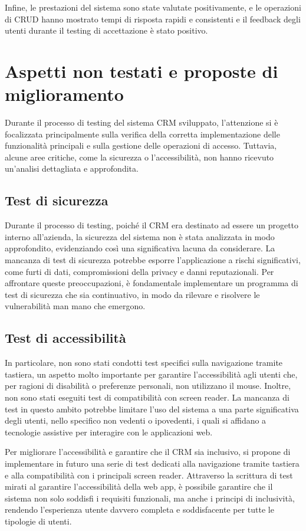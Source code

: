 \documentclass[target=bach,aauheader=,style=]{thud}
\begin{document}
\noindent Infine, le prestazioni del sistema sono state valutate positivamente, e le operazioni di CRUD hanno mostrato tempi di risposta rapidi e consistenti e il feedback degli utenti durante il testing di accettazione è stato positivo.

\section{Aspetti non testati e proposte di miglioramento}
Durante il processo di testing del sistema CRM sviluppato, l'attenzione si è focalizzata principalmente sulla verifica della corretta implementazione delle funzionalità principali e sulla gestione delle operazioni di accesso. Tuttavia, alcune aree critiche, come la sicurezza o l'accessibilità, non hanno ricevuto un'analisi dettagliata e approfondita. 

\subsection{Test di sicurezza}
Durante il processo di testing, poiché il CRM era destinato ad essere un progetto interno all'azienda, la sicurezza del sistema non è stata analizzata in modo approfondito, evidenziando così una significativa lacuna da considerare. La mancanza di test di sicurezza potrebbe esporre l'applicazione a rischi significativi, come furti di dati, compromissioni della privacy e danni reputazionali. Per affrontare queste preoccupazioni, è fondamentale implementare un programma di test di sicurezza che sia continuativo, in modo da rilevare e risolvere le vulnerabilità man mano che emergono. 

\subsection{Test di accessibilità}
In particolare, non sono stati condotti test specifici sulla navigazione tramite tastiera, un aspetto molto importante per garantire l'accessibilità agli utenti che, per ragioni di disabilità o preferenze personali, non utilizzano il mouse. Inoltre, non sono stati eseguiti test di compatibilità con screen reader. La mancanza di test in questo ambito potrebbe limitare l'uso del sistema a una parte significativa degli utenti, nello specifico non vedenti o ipovedenti, i quali si affidano a tecnologie assistive per interagire con le applicazioni web. 

\noindent Per migliorare l'accessibilità e garantire che il CRM sia inclusivo, si propone di implementare in futuro una serie di test dedicati alla navigazione tramite tastiera e alla compatibilità con i principali screen reader. Attraverso la scrittura di test mirati al garantire l'accessibilità della web app, è possibile garantire che il sistema non solo soddisfi i requisiti funzionali, ma anche i principi di inclusività, rendendo l'esperienza utente davvero completa e soddisfacente per tutte le tipologie di utenti.
\end{document}
